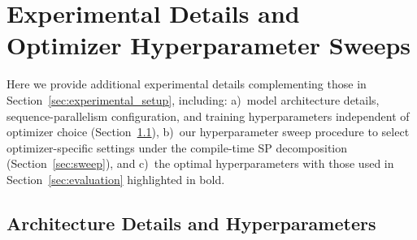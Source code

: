 \documentclass{article}
\begin{document}






\appendix



\section{Experimental Details and Optimizer Hyperparameter Sweeps}
\label{sec:appendix_a}

Here we provide additional experimental details complementing those in Section~\ref{sec:experimental_setup}, including: a)~model architecture details, sequence-parallelism configuration, and training hyperparameters independent of optimizer choice (Section~\ref{sec:arch_details}), b)~our hyperparameter sweep procedure to select optimizer-specific settings under the compile-time SP decomposition (Section~\ref{sec:sweep}), and c)~the optimal hyperparameters with those used in Section~\ref{sec:evaluation} highlighted in bold.

\subsection{Architecture Details and Hyperparameters}
\label{sec:arch_details}
\end{document}
